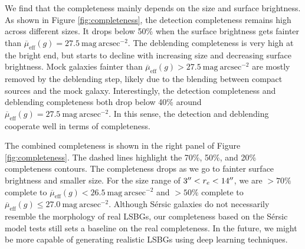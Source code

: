 \documentclass[twocolumn,astrosymb,twocolappendix]{aastex631}
\newcommand{\sbunit}{\mathrm{mag\ arcsec}^{-2}}
\newcommand{\sbeff}{\overline{\mu}_{\mathrm{eff}}(g)}
\newcommand{\sersic}{S\'ersic}
\begin{document}
\begin{CJK*}{UTF8}{gbsn}
We find that the completeness mainly depends on the size and surface brightness. As shown in Figure \ref{fig:completeness}, the detection completeness remains high across different sizes. It drops below 50\% when the surface brightness gets fainter than $\sbeff = 27.5\ \sbunit$. The deblending completeness is very high at the bright end, but starts to decline with increasing size and decreasing surface brightness. Mock galaxies fainter than $\sbeff > 27.5\ \sbunit$ are mostly removed by the deblending step, likely due to the blending between compact sources and the mock galaxy. Interestingly, the detection completeness and deblending completeness both drop below 40\% around $\sbeff=27.5\ \sbunit$. In this sense, the detection and deblending cooperate well in terms of completeness. 

The combined completeness is shown in the right panel of Figure \ref{fig:completeness}. The dashed lines highlight the 70\%, 50\%, and 20\% completeness contours. The completeness drops as we go to fainter surface brightness and smaller size. For the size range of $3\mbox{$^{\prime\prime}$} < r_e < 14\mbox{$^{\prime\prime}$}$, we are $>70\%$ complete to $\sbeff < 26.5\ \sbunit$ and $>50\%$ complete to $\sbeff \leqslant 27.0\ \sbunit$. Although \sersic{} galaxies do not necessarily resemble the morphology of real LSBGs, our completeness based on the \sersic{} model tests still sets a baseline on the real completeness. In the future, we might be more capable of generating realistic LSBGs using deep learning techniques.


\end{CJK*}
\end{document}
